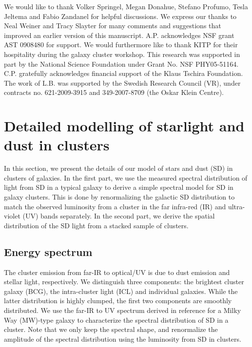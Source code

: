 \documentclass[10pt,aps,pra,reprint,amsmath,amsfonts,amssymb,showpacs,nofootinbib,floatfix]{revtex4-1}
\begin{document}
\smallskip We would like to thank Volker Springel, Megan Donahue,
Stefano Profumo, Tesla Jeltema and Fabio Zandanel for helpful
discussions. We express our thanks to Neal Weiner and Tracy Slayter
for many comments and suggestions that improved an earlier version of
this manuscript. A.P. acknowledges NSF grant AST 0908480 for
support. We would furthermore like to thank KITP for their hospitality
during the galaxy cluster workshop. This research was supported in
part by the National Science Foundation under Grant No. NSF
PHY05-51164. C.P. gratefully acknowledges financial support of the
Klaus Tschira Foundation. The work of L.B. was supported by the
Swedish Research Council (VR), under contracts no. 621-2009-3915 and
349-2007-8709 (the Oskar Klein Centre).


\vspace{-0.7cm}

%
%

\appendix

\section{Detailed modelling of starlight and dust in clusters}
\label{sect:SD}
In this section, we present the details of our model of stars and dust
(SD) in clusters of galaxies. In the first part, we use the measured
spectral distribution of light from SD in a typical galaxy to derive a
simple spectral model for SD in galaxy clusters. This is done by
renormalizing the galactic SD distribution to match the observed luminosity
from a cluster in the far infra-red (IR) and ultra-violet (UV) bands
separately. In the second part, we derive the spatial distribution of
the SD light from a stacked sample of clusters.

\subsection{Energy spectrum}
The cluster emission from far-IR to optical/UV is due to dust emission
and stellar light, respectively. We distinguish three components: the
brightest cluster galaxy (BCG), the intra-cluster light (ICL) and
individual galaxies. While the latter distribution is highly clumped,
the first two components are smoothly distributed. We use the far-IR
to UV spectrum derived in reference \cite{2006ApJ...648L..29P} for a
Milky Way (MW)-type galaxy to characterize the spectral distribution
of SD in a cluster. Note that we only keep the spectral shape, and
renormalize the amplitude of the spectral distribution using the
luminosity from SD in clusters.
\end{document}
